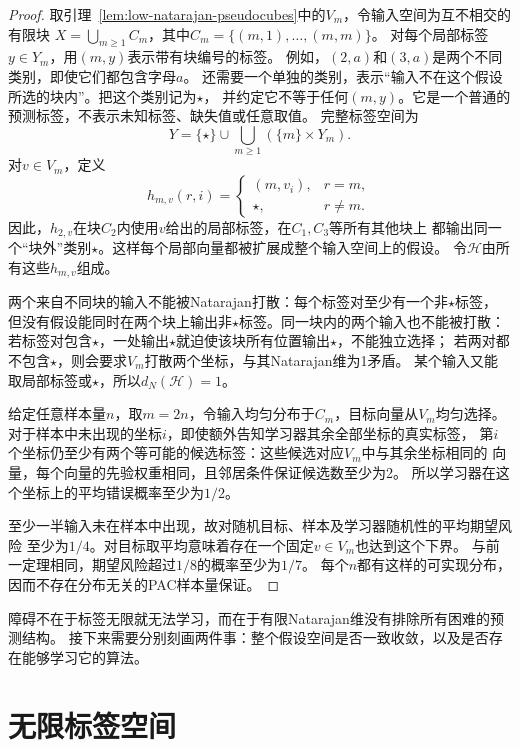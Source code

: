 \begin{proof}
取引理~\ref{lem:low-natarajan-pseudocubes}中的$V_m$，令输入空间为互不相交的有限块
$X=\bigcup_{m\geq1}C_m$，其中$C_m=\{(m,1),\ldots,(m,m)\}$。
对每个局部标签$y\in Y_m$，用$(m,y)$表示带有块编号的标签。
例如，$(2,a)$和$(3,a)$是两个不同类别，即使它们都包含字母$a$。
还需要一个单独的类别，表示“输入不在这个假设所选的块内”。把这个类别记为$\star$，
并约定它不等于任何$(m,y)$。它是一个普通的预测标签，不表示未知标签、缺失值或任意取值。
完整标签空间为
\[
 Y=\{\star\}\cup\bigcup_{m\geq1}(\{m\}\times Y_m).
\]
对$v\in V_m$，定义
\[
 h_{m,v}(r,i)=
 \begin{cases}
 (m,v_i),&r=m,\\
 \star,&r\neq m.
 \end{cases}
\]
因此，$h_{2,v}$在块$C_2$内使用$v$给出的局部标签，在$C_1,C_3$等所有其他块上
都输出同一个“块外”类别$\star$。这样每个局部向量都被扩展成整个输入空间上的假设。
令$\mathcal H$由所有这些$h_{m,v}$组成。

两个来自不同块的输入不能被Natarajan打散：每个标签对至少有一个非$\star$标签，
但没有假设能同时在两个块上输出非$\star$标签。同一块内的两个输入也不能被打散：
若标签对包含$\star$，一处输出$\star$就迫使该块所有位置输出$\star$，不能独立选择；
若两对都不包含$\star$，则会要求$V_m$打散两个坐标，与其Natarajan维为1矛盾。
某个输入又能取局部标签或$\star$，所以$d_N(\mathcal H)=1$。

给定任意样本量$n$，取$m=2n$，令输入均匀分布于$C_m$，目标向量从$V_m$均匀选择。
对于样本中未出现的坐标$i$，即使额外告知学习器其余全部坐标的真实标签，
第$i$个坐标仍至少有两个等可能的候选标签：这些候选对应$V_m$中与其余坐标相同的
向量，每个向量的先验权重相同，且邻居条件保证候选数至少为2。
所以学习器在这个坐标上的平均错误概率至少为$1/2$。

至少一半输入未在样本中出现，故对随机目标、样本及学习器随机性的平均期望风险
至少为$1/4$。对目标取平均意味着存在一个固定$v\in V_m$也达到这个下界。
与前一定理相同，期望风险超过$1/8$的概率至少为$1/7$。
每个$n$都有这样的可实现分布，因而不存在分布无关的PAC样本量保证。
\end{proof}

障碍不在于标签无限就无法学习，而在于有限Natarajan维没有排除所有困难的预测结构。
接下来需要分别刻画两件事：整个假设空间是否一致收敛，以及是否存在能够学习它的算法。

\section{无限标签空间}
\label{sec:general-multiclass-dimensions}
\label{sec:multiclass-sample-complexity}


